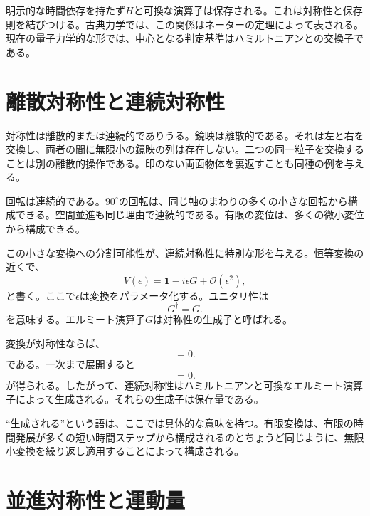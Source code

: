 明示的な時間依存を持たず\(H\)と可換な演算子は保存される。これは対称性と保存則を結びつける。古典力学では、この関係はネーターの定理によって表される。現在の量子力学的な形では、中心となる判定基準はハミルトニアンとの交換子である。

\section{離散対称性と連続対称性}

対称性は離散的または連続的でありうる。鏡映は離散的である。それは左と右を交換し、両者の間に無限小の鏡映の列は存在しない。二つの同一粒子を交換することは別の離散的操作である。印のない両面物体を裏返すことも同種の例を与える。

回転は連続的である。\(90^\circ\)の回転は、同じ軸のまわりの多くの小さな回転から構成できる。空間並進も同じ理由で連続的である。有限の変位は、多くの微小変位から構成できる。

この小さな変換への分割可能性が、連続対称性に特別な形を与える。恒等変換の近くで、
\begin{equation}
V(\epsilon)
=
\mathbf 1-i\epsilon G+\mathcal O(\epsilon^2),
\end{equation}
と書く。ここで\(\epsilon\)は変換をパラメータ化する。ユニタリ性は
\begin{equation}
G^\dagger=G.
\end{equation}
を意味する。エルミート演算子\(G\)は対称性の生成子と呼ばれる。

変換が対称性ならば、
\begin{equation}
[H,V(\epsilon)]=0.
\end{equation}
である。一次まで展開すると
\begin{equation}
[H,G]=0.
\end{equation}
が得られる。したがって、連続対称性はハミルトニアンと可換なエルミート演算子によって生成される。それらの生成子は保存量である。

``生成される''という語は、ここでは具体的な意味を持つ。有限変換は、有限の時間発展が多くの短い時間ステップから構成されるのとちょうど同じように、無限小変換を繰り返し適用することによって構成される。

\section{並進対称性と運動量}


